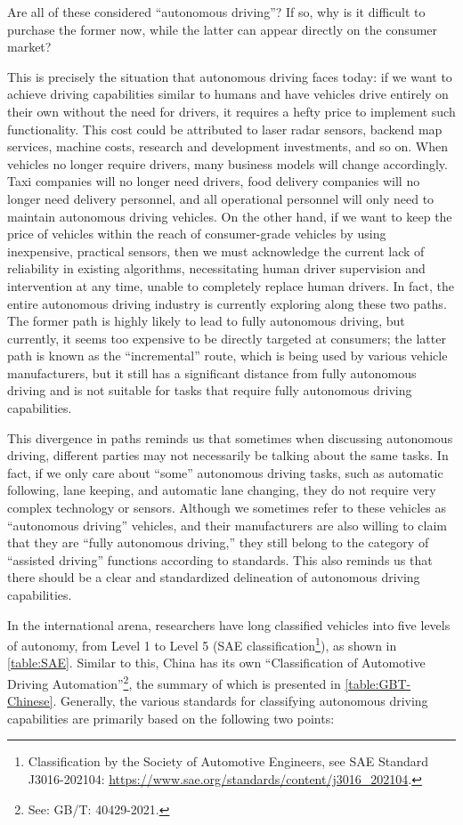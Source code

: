 Are all of these considered ``autonomous driving''? If so, why is it difficult to purchase the former now, while the latter can appear directly on the consumer market?

This is precisely the situation that autonomous driving faces today: if we want to achieve driving capabilities similar to humans and have vehicles drive entirely on their own without the need for drivers, it requires a hefty price to implement such functionality. This cost could be attributed to laser radar sensors, backend map services, machine costs, research and development investments, and so on. When vehicles no longer require drivers, many business models will change accordingly. Taxi companies will no longer need drivers, food delivery companies will no longer need delivery personnel, and all operational personnel will only need to maintain autonomous driving vehicles. On the other hand, if we want to keep the price of vehicles within the reach of consumer-grade vehicles by using inexpensive, practical sensors, then we must acknowledge the current lack of reliability in existing algorithms, necessitating human driver supervision and intervention at any time, unable to completely replace human drivers. In fact, the entire autonomous driving industry is currently exploring along these two paths. The former path is highly likely to lead to fully autonomous driving, but currently, it seems too expensive to be directly targeted at consumers; the latter path is known as the ``incremental'' route, which is being used by various vehicle manufacturers, but it still has a significant distance from fully autonomous driving and is not suitable for tasks that require fully autonomous driving capabilities.

This divergence in paths reminds us that sometimes when discussing autonomous driving, different parties may not necessarily be talking about the same tasks. In fact, if we only care about ``some'' autonomous driving tasks, such as automatic following, lane keeping, and automatic lane changing, they do not require very complex technology or sensors. Although we sometimes refer to these vehicles as ``autonomous driving'' vehicles, and their manufacturers are also willing to claim that they are ``fully autonomous driving,'' they still belong to the category of ``assisted driving'' functions according to standards. This also reminds us that there should be a clear and standardized delineation of autonomous driving capabilities.

In the international arena, researchers have long classified vehicles into five levels of autonomy, from Level 1 to Level 5 (SAE classification\footnote{Classification by the Society of Automotive Engineers, see SAE Standard J3016-202104: \url{https://www.sae.org/standards/content/j3016_202104}.}), as shown in \autoref{table:SAE}. Similar to this, China has its own ``Classification of Automotive Driving Automation''\footnote{See: GB/T: 40429-2021.}, the summary of which is presented in \ref{table:GBT-Chinese}. Generally, the various standards for classifying autonomous driving capabilities are primarily based on the following two points:

